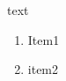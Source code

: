 \documentclass{report}
\begin{document}
    \caption{text}

      \begin{enumerate}
        \item Item1
        \item item2
    \end{enumerate}


\end{document}
